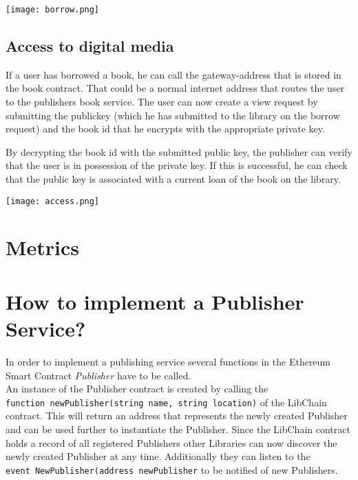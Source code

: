\vspace{0.3cm}
\begin{center}
\texttt{[image: borrow.png]}
\end{center}

\subsection{Access to digital media \label{sssec:access}}
If a user has borrowed a book, he can call the gateway-address that is stored in the book contract. That could be a normal internet address that routes the user to the publishers book service.
The user can now create a view request by submitting the publickey (which he has submitted to the library on the borrow request) and the book id that he encrypts with the appropriate private key.

By decrypting the book id with the submitted public key, the publisher can verify that the user is in possession of the private key. If this is successful, he can check that the public key is associated with a current loan of the book on the library.


\vspace{0.3cm}
\begin{center}
\texttt{[image: access.png]}
\end{center}

\section{Metrics}

\section{How to implement a Publisher Service?}
In order to implement a publishing service several functions in the Ethereum Smart Contract \textit{Publisher} have to be called. \\
An instance of the Publisher contract is created by calling the \\
 \verb|function newPublisher(string name, string location)| of the LibChain contract. This will return an address that represents the newly created Publisher and can be used further to instantiate the Publisher. Since the LibChain contract holds a record of all registered Publishers other Libraries can now discover the newly created Publisher at any time. Additionally they can listen to the \\
 \verb|event NewPublisher(address newPublisher| to be notified of new Publishers.
